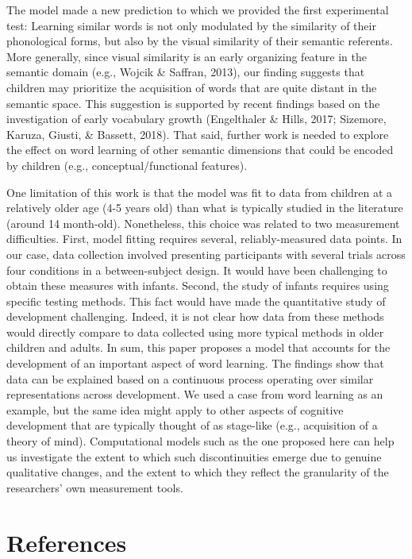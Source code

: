 \documentclass[10pt, letterpaper]{article}
\begin{document}
The model made a new prediction to which we provided the first
experimental test: Learning similar words is not only modulated by the
similarity of their phonological forms, but also by the visual
similarity of their semantic referents. More generally, since visual
similarity is an early organizing feature in the semantic domain (e.g.,
Wojcik \& Saffran, 2013), our finding suggests that children may
prioritize the acquisition of words that are quite distant in the
semantic space. This suggestion is supported by recent findings based on
the investigation of early vocabulary growth (Engelthaler \& Hills,
2017; Sizemore, Karuza, Giusti, \& Bassett, 2018). That said, further
work is needed to explore the effect on word learning of other semantic
dimensions that could be encoded by children (e.g.,
conceptual/functional features).

One limitation of this work is that the model was fit to data from
children at a relatively older age (4-5 years old) than what is
typically studied in the literature (around 14 month-old). Nonetheless,
this choice was related to two measurement difficulties. First, model
fitting requires several, reliably-measured data points. In our case,
data collection involved presenting participants with several trials
across four conditions in a between-subject design. It would have been
challenging to obtain these measures with infants. Second, the study of
infants requires using specific testing methods. This fact would have
made the quantitative study of development challenging. Indeed, it is
not clear how data from these methods would directly compare to data
collected using more typical methods in older children and adults. In
sum, this paper proposes a model that accounts for the development of an
important aspect of word learning. The findings show that data can be
explained based on a continuous process operating over similar
representations across development. We used a case from word learning as
an example, but the same idea might apply to other aspects of cognitive
development that are typically thought of as stage-like (e.g.,
acquisition of a theory of mind). Computational models such as the one
proposed here can help us investigate the extent to which such
discontinuities emerge due to genuine qualitative changes, and the
extent to which they reflect the granularity of the researchers' own
measurement tools.

\section{References}\label{references}
\end{document}
